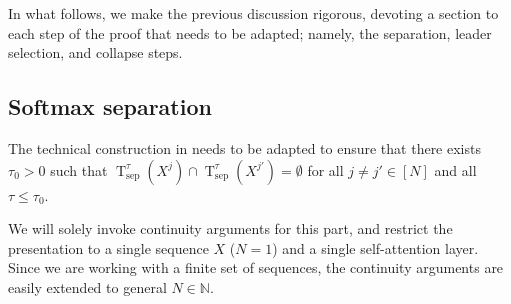 \documentclass[pdflatex,sn-mathphys-num]{sn-jnl}%
\theoremstyle{thmstyleone}%
\theoremstyle{thmstyletwo}%
\theoremstyle{thmstylethree}%
\numberwithin{equation}{section}
\newcommand{\N}{\mathbb{N}}
\DeclareMathOperator{\T}{\mathrm{T}}
\begin{document}
In what follows, we make the previous discussion rigorous, devoting a section to each step of the proof that needs to be adapted; namely, the separation, leader selection, and collapse steps. 

\subsection{Softmax separation}

The technical construction in  needs to be adapted to ensure that there exists $\tau_0 > 0$ such that $\T^\tau_{\text{sep}}(X^j) \cap \T^\tau_{\text{sep}}(X^{j'}) = \emptyset$ for all $j\neq j'\in [N]$ and all $\tau \leq \tau_0$.

We will solely invoke continuity arguments for this part, and restrict the presentation to a single sequence $X$ ($N =1$) and a single self-attention layer. Since we are working with a finite set of sequences, the continuity arguments are easily extended to general $N \in \N$.
\end{document}
